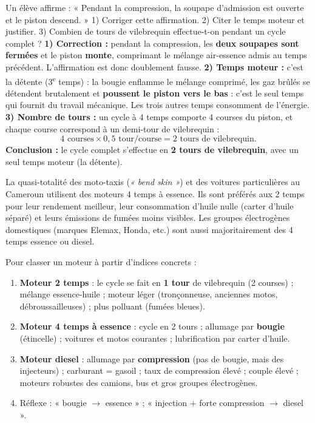 \documentclass[11pt]{article}
\newcommand{\cle}[1]{{\popxbold\color{popdark}#1}}
\begin{document}
\begin{exoresolu}
Un élève affirme : « Pendant la compression, la soupape d'admission est ouverte et le piston descend. » 1) Corriger cette affirmation. 2) Citer le temps moteur et justifier. 3) Combien de tours de vilebrequin effectue-t-on pendant un cycle complet ?
\tcblower
\textbf{1) Correction :} pendant la \cle{compression}, les \textbf{deux soupapes sont fermées} et le piston \textbf{monte}, comprimant le mélange air-essence admis au temps précédent. L'affirmation est donc doublement fausse.
\textbf{2) Temps moteur :} c'est la \cle{détente} (3\textsuperscript{e} temps) : la bougie enflamme le mélange comprimé, les gaz brûlés se détendent brutalement et \textbf{poussent le piston vers le bas} : c'est le seul temps qui fournit du travail mécanique. Les trois autres temps consomment de l'énergie.
\textbf{3) Nombre de tours :} un cycle à 4 temps comporte 4 courses du piston, et chaque course correspond à un demi-tour de vilebrequin :
\[ 4 \text{ courses} \times 0{,}5 \text{ tour/course} = 2 \text{ tours de vilebrequin.} \]
\textbf{Conclusion :} le cycle complet s'effectue en \textbf{2 tours de vilebrequin}, avec un seul temps moteur (la détente).
\end{exoresolu}

\begin{savaistu}
La quasi-totalité des moto-taxis (\emph{« bend skin »}) et des voitures particulières au Cameroun utilisent des moteurs 4 temps à essence. Ils sont préférés aux 2 temps pour leur rendement meilleur, leur consommation d'huile nulle (carter d'huile séparé) et leurs émissions de fumées moins visibles. Les groupes électrogènes domestiques (marques Elemax, Honda, etc.) sont aussi majoritairement des 4 temps essence ou diesel.
\end{savaistu}

\begin{methode}
Pour classer un moteur à partir d'indices concrets :
\begin{enumerate}
\item \textbf{Moteur 2 temps} : le cycle se fait en \textbf{1 tour} de vilebrequin (2 courses) ; mélange essence-huile ; moteur léger (tronçonneuse, anciennes motos, débroussailleuses) ; plus polluant (fumées bleues).
\item \textbf{Moteur 4 temps à essence} : cycle en 2 tours ; allumage par \textbf{bougie} (étincelle) ; voitures et motos courantes ; lubrification par carter d'huile.
\item \textbf{Moteur diesel} : allumage par \textbf{compression} (pas de bougie, mais des injecteurs) ; carburant = gasoil ; taux de compression élevé ; couple élevé ; moteurs robustes des camions, bus et gros groupes électrogènes.
\item Réflexe : « bougie $\rightarrow$ essence » ; « injection + forte compression $\rightarrow$ diesel ».
\end{enumerate}
\end{methode}
\end{document}
